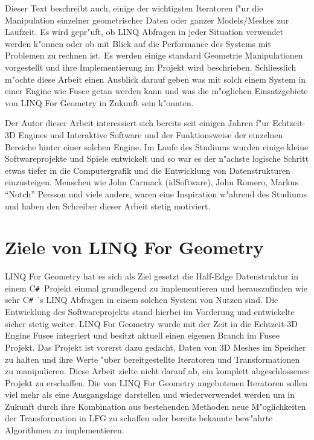 \documentclass[pagesize, paper=a4, fontsize=12pt,titlepage=true, headings=small, headnosepline, abstractoff, liststotoc, nochapterprefix, plainheadsepline]{scrreprt}
\newcommand{\CSS}{C\texttt{\# }}
\newcommand{\LFG}{LINQ For Geometry}
\newcommand{\LFGS}{LINQ For Geometry }
\newcommand{\LQ}{ LINQ }
\newcommand{\HES}{Half-Edge Datenstruktur }
\begin{document}
Dieser Text beschreibt auch, einige der wichtigsten Iteratoren f"ur die Manipulation einzelner geometrischer Daten oder ganzer Models/Meshes zur Laufzeit. Es wird gepr"uft, ob LINQ Abfragen in jeder Situation verwendet werden k"onnen oder ob mit Blick auf die Performance des Systems mit Problemen zu rechnen ist. Es werden einige standard Geometrie Manipulationen vorgestellt und ihre Implementierung im Projekt wird beschrieben. Schliesslich m"ochte diese Arbeit einen Ausblick darauf geben was mit solch einem System in einer Engine wie Fusee getan werden kann und was die m"oglichen Einsatzgebiete von \LFGS in Zukunft sein k"onnten.
\newline

Der Autor dieser Arbeit interessiert sich bereits seit einigen Jahren f"ur Echtzeit-3D Engines und Interaktive Software und der Funktionsweise der einzelnen Bereiche hinter einer solchen Engine. Im Laufe des Studiums wurden einige kleine Softwareprojekte und Spiele entwickelt und so war es der n"achste logische Schritt etwas tiefer in die Computergrafik und die Entwicklung von Datenstrukturen einzusteigen. Menschen wie John Carmack (idSoftware), John Romero, Markus "`Notch"' Persson und viele andere, waren eine Inspiration w"ahrend des Studiums und haben den Schreiber dieser Arbeit stetig motiviert.
	
	\section {Ziele von \LFG}
	\LFGS hat es sich als Ziel gesetzt die \HES in einem \CSS Projekt einmal grundlegend zu implementieren und herauszufinden wie sehr \CSS's LINQ Abfragen in einem solchen System von Nutzen sind. Die Entwicklung des Softwareprojekts stand hierbei im Vorderung und entwickelte sicher stetig weiter. \LFGS wurde mit der Zeit in die Echtzeit-3D Engine Fusee integriert und besitzt aktuell einen eigenen Branch im Fusee Projekt. Das Projekt ist vorerst dazu gedacht, Daten von 3D Meshes im Speicher zu halten und ihre Werte "uber bereitgestellte Iteratoren und Transformationen zu manipulieren. Diese Arbeit zielte nicht darauf ab, ein komplett abgeschlossenes Projekt zu erschaffen. Die von \LFGS angebotenen Iteratoren sollen viel mehr als eine Ausgangslage darstellen und wiederverwendet werden um in Zukunft durch ihre Kombination aus bestehenden Methoden neue M"oglichkeiten der Transformation in LFG zu schaffen oder bereits bekannte bew"ahrte Algorithmen zu implementieren.
\end{document}
